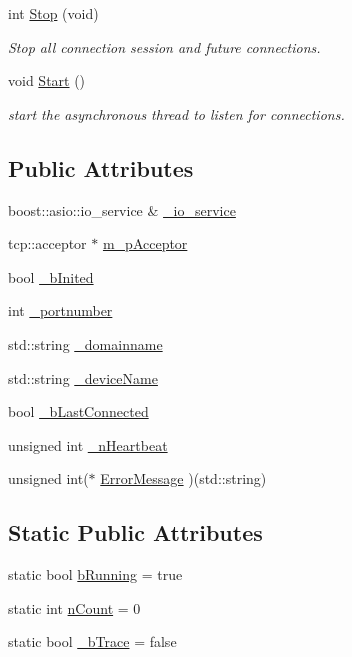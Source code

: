 \begin{DoxyCompactItemize}
int \hyperlink{classCAsioCrclServer_a79f5c7c1e7f291c0977ed40c9324b1ae}{Stop} (void)
\begin{DoxyCompactList}\small\item\em Stop all connection session and future connections. \end{DoxyCompactList}\item 
void \hyperlink{classCAsioCrclServer_abb80941c7f13b8d23b77804519fc6ea1}{Start} ()
\begin{DoxyCompactList}\small\item\em start the asynchronous thread to listen for connections. \end{DoxyCompactList}\end{DoxyCompactItemize}
\subsection*{Public Attributes}
\begin{DoxyCompactItemize}
\item 
boost\-::asio\-::io\-\_\-service \& \hyperlink{classCAsioCrclServer_a856ce7cbc3dea93ba07b7b5583de953a}{\-\_\-io\-\_\-service}
\item 
tcp\-::acceptor $\ast$ \hyperlink{classCAsioCrclServer_a3683f25664211e9bd73bdfb6dfe68f00}{m\-\_\-p\-Acceptor}
\item 
bool \hyperlink{classCAsioCrclServer_a1b68e1872f4b8bba8def3e433a2f2f92}{\-\_\-b\-Inited}
\item 
int \hyperlink{classCAsioCrclServer_ab10b3071051c4889372d0eb30bacc604}{\-\_\-portnumber}
\item 
std\-::string \hyperlink{classCAsioCrclServer_abd6cbb0022e0c2280995faf988ab0425}{\-\_\-domainname}
\item 
std\-::string \hyperlink{classCAsioCrclServer_a70d2177e5e78081e8296c1c0409763d2}{\-\_\-device\-Name}
\item 
bool \hyperlink{classCAsioCrclServer_a8981e762f986843227b5df9e256a1614}{\-\_\-b\-Last\-Connected}
\item 
unsigned int \hyperlink{classCAsioCrclServer_ac570936983b073ee12604164b0e08995}{\-\_\-n\-Heartbeat}
\item 
unsigned int($\ast$ \hyperlink{classCAsioCrclServer_a705b81d958ac4521f086761c30a9eda8}{Error\-Message} )(std\-::string)
\end{DoxyCompactItemize}
\subsection*{Static Public Attributes}
\begin{DoxyCompactItemize}
\item 
static bool \hyperlink{classCAsioCrclServer_a2760cb716a58bf1bb3de970e806b7e94}{b\-Running} = true
\item 
static int \hyperlink{classCAsioCrclServer_ac5689559a71c457e5b397719d7dd11b6}{n\-Count} = 0
\item 
static bool \hyperlink{classCAsioCrclServer_ae2ed42c399a04caf7af7b2c1e7e98d9a}{\-\_\-b\-Trace} = false
\end{DoxyCompactItemize}



